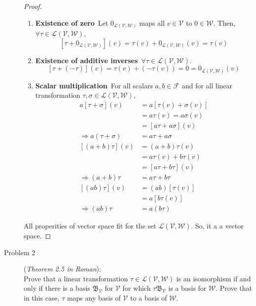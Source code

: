 \documentclass[a4paper]{article}
\begin{document}
\begin{description}
\begin{proof}
\begin{enumerate}[ 1) ]
    \item \textbf{Existence of zero}\ Let $0_{\mathcal{L}\left(\mathcal{V},\mathcal{W}\right)}$ maps all $v\in \mathcal{V}$ to $0\in \mathcal{W}$. Then, $\forall \tau \in \mathcal{L}\left(\mathcal{V},\mathcal{W}\right)$,
    $$[\tau+0_{\mathcal{L}\left(\mathcal{V},\mathcal{W}\right)}](v)=\tau(v)+0_{\mathcal{L}\left(\mathcal{V},\mathcal{W}\right)}(v)=\tau(v)$$
    \item \textbf{Existence of additive inverses}\ $\forall \tau \in \mathcal{L}\left(\mathcal{V},\mathcal{W}\right)$.
    $$[\tau+(-\tau)](v)=\tau(v)+(-\tau(v))=0=0_{\mathcal{L}\left(\mathcal{V},\mathcal{W}\right)}(v)$$
    \item \textbf{Scalar multiplication}\ For all scalars $a,b\in \mathcal{F}$ and for all linear transformation $\tau,\sigma \in \mathcal{L}\left(\mathcal{V},\mathcal{W}\right)$,
    \begin{align*}
      a[\tau+\sigma](v)&=a[\tau(v)+\sigma(v)]\\
      &=a\tau(v)=a\sigma(v)\\
      &=[a\tau+a\sigma](v)\\
      \Rightarrow a(\tau+\sigma)&=a\tau+a\sigma\\
      [(a+b)\tau](v)&=(a+b)\tau(v)\\
      &=a\tau(v)+b\tau(v)\\
      &=[a\tau+b\tau](v)\\
      \Rightarrow (a+b)\tau&=a\tau+b\tau\\
      [(ab)\tau](v)&=(ab)[\tau(v)]\\
      &=a[b\tau(v)]\\
      \Rightarrow (ab)\tau&=a(b\tau)
    \end{align*}
  \end{enumerate}
  All properities of vector space fit for the set  $\mathcal{L}(\mathcal{V},\mathcal{W})$. So, it a a vector space.
\end{proof}

\item[Problem 2](\textit{Theorem 2.5 in Roman}):\\
Prove that a linear transformation $\tau \in \mathcal{L}(\mathcal{V},\mathcal{W})$ is an isomorphism if and only if there is a basis $\mathfrak{B}_\mathcal{V}$ for $\mathcal{V}$ for which $\tau\mathfrak{B}_\mathcal{V}$ is a basis for $\mathcal{W}$. Prove that in this case, $\tau$ maps any basis of $\mathcal{V}$ to a basis of $\mathcal{W}$.


\end{description}
\end{document}
